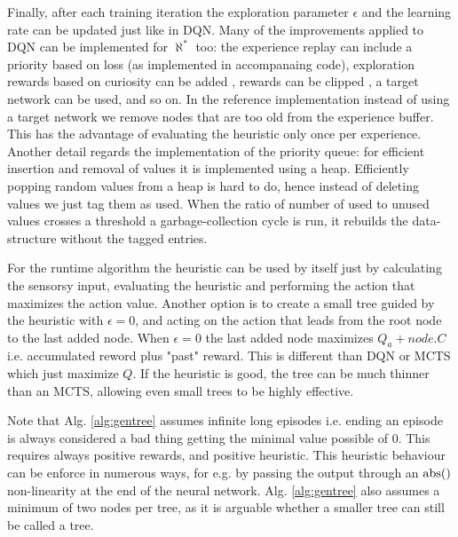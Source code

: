 \documentclass{article}
\newcommand{\alephstar}{$\aleph^*$ }
\begin{document}
Finally, after each training iteration the exploration parameter $\epsilon$ and the learning rate can be updated just like in DQN. Many of the improvements applied to DQN can be implemented for \alephstar too: the experience replay can include a priority based on loss \cite{schaul2015prioritized} (as implemented in accompanaing code), exploration rewards based on curiosity can be added \cite{burda2018exploration}, rewards can be clipped \cite{pohlen2018observe}, a target network can be used, and so on. In the reference implementation instead of using a target network we remove nodes that are too old from the experience buffer. This has the advantage of evaluating the heuristic only once per experience. Another detail regards the implementation of the priority queue: for efficient insertion and removal of values it is implemented using a heap. Efficiently popping random values from a heap is hard to do, hence instead of deleting values we just tag them as used. When the ratio of number of used to unused values crosses a threshold a garbage-collection cycle is run, it rebuilds the data-structure without the tagged entries.

For the runtime algorithm the heuristic can be used by itself just by calculating the sensorsy input, evaluating the heuristic and performing the action that maximizes the action value. Another option is to create a small tree guided by the heuristic with $\epsilon=0$, and acting on the action that leads from the root node to the last added node. When $\epsilon=0$ the last added node maximizes $Q_a + \mathit{node.C}$ i.e. accumulated reword plus "past" reward. This is different than DQN or MCTS which just maximize $Q$. If the heuristic is good, the tree can be much thinner than an MCTS, allowing even small trees to be highly effective.

Note that Alg. \ref{alg:gentree} assumes infinite long episodes i.e. ending an episode is always considered a bad thing getting the minimal value possible of $0$. This requires always positive rewards, and positive heuristic. This heuristic behaviour can be enforce in numerous ways, for e.g. by passing the output through an $\rm abs()$ non-linearity at the end of the neural network. Alg. \ref{alg:gentree} also assumes a minimum of two nodes per tree, as it is arguable whether a smaller tree can still be called a tree.
\end{document}
